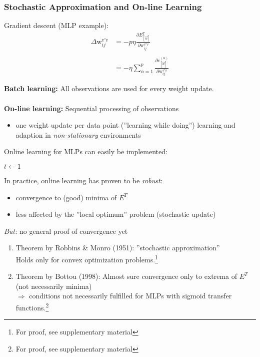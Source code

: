 \subsubsection{Stochastic Approximation and On-line Learning}
Gradient descent (MLP example):
\begin{equation}
	\begin{array}{ll}
	\Delta \mathrm{w}_{ij}^{v'v} 
	& = -p \eta \frac{\partial E_{[\vec{w}]}^T}{
		\partial \mathrm{w}_{ij}^{v'v}} \\\\
	& = -\eta \sum\limits_{\alpha = 1}^p \frac{
		\partial e_{[\vec{w}]}^{(\alpha)}}{
		\partial \mathrm{w}_{ij}^{v'v}} \\\\
	\end{array}
\end{equation}
{\bf Batch learning:} All observations are used for every weight update.
\\\\
{\bf On-line learning:} Sequential processing of observations
\begin{itemize}
\item  one weight update per data point (''learning while doing'')
  \itl learning and adaption in \emph{non-stationary} environments
\end{itemize}
Online learning for MLPs can easily be implemented:
\begin{algorithm}
  \DontPrintSemicolon
  $t \leftarrow 1$\;
\caption{On-line learning of MLP-weights}
\end{algorithm}
\newline
In practice, online learning has proven to be \emph{robust}: 
\begin{itemize}
	\item convergence to (good) minima of $E^T$
	\item less affected by the ''local optimum'' problem (stochastic update)
\end{itemize}
\emph{But:} no general proof of convergence yet
\begin{enumerate}[(1)]
\item Theorem by Robbins \& Monro (1951): ''stochastic approximation''\\
  Holds only for convex optimization problems.\footnote{For proof, see
    supplementary material}
\item Theorem by Bottou (1998): Almost sure convergence only to extrema of $E^T$
(not necessarily minima)\\
  $\Rightarrow$ conditions not necessarily fulfilled for MLPs with
  sigmoid transfer functions.\footnote{For proof, see supplementary material}
\end{enumerate}
